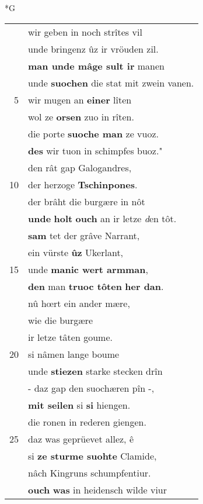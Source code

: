 \documentclass[8pt,a4paper,notitlepage]{article}
\begin{document}
\newpage
\begin{table}[ht]
\begin{minipage}[t]{0.5\linewidth}
\small
\begin{center}*G
\end{center}
\begin{tabular}{rl}
 & wir geben in noch strîtes vil\\ 
 & unde bringenz ûz ir vröuden zil.\\ 
 & \textbf{man unde mâge sult ir} manen\\ 
 & unde \textbf{suochen} die stat mit zwein vanen.\\ 
5 & wir mugen an \textbf{einer} lîten\\ 
 & wol ze \textbf{orsen} zuo in rîten.\\ 
 & die porte \textbf{suoche man} ze vuoz.\\ 
 & \textbf{des} wir tuon in schimpfes buoz."\\ 
 & den rât gap Galogandres,\\ 
10 & der herzoge \textbf{Tschinpones}.\\ 
 & der brâht die burgære in nôt\\ 
 & \textbf{unde} \textbf{holt} \textbf{ouch} an ir letze \textit{d}en tôt.\\ 
 & \textbf{sam} tet der grâve Narrant,\\ 
 & ein vürste \textbf{ûz} Ukerlant,\\ 
15 & unde \textbf{manic wert armman},\\ 
 & \textbf{den} man \textbf{truoc tôten} \textbf{her dan}.\\ 
 & nû hœrt ein ander mære,\\ 
 & wie die burgære\\ 
 & ir letze tâten goume.\\ 
20 & si nâmen lange boume\\ 
 & unde \textbf{stiezen} starke stecken drîn\\ 
 & - daz gap den suochæren pîn -,\\ 
 & \textbf{mit seilen} si \textbf{si} hiengen.\\ 
 & die ronen in rederen giengen.\\ 
25 & daz was geprüevet allez, ê\\ 
 & si \textbf{ze sturme suohte} Clamide,\\ 
 & nâch Kingruns schumpfentiur.\\ 
 & \textbf{ouch} \textbf{was} in heidensch wilde viur\\ 

\end{tabular}
\end{minipage}
\end{table}
\end{document}
